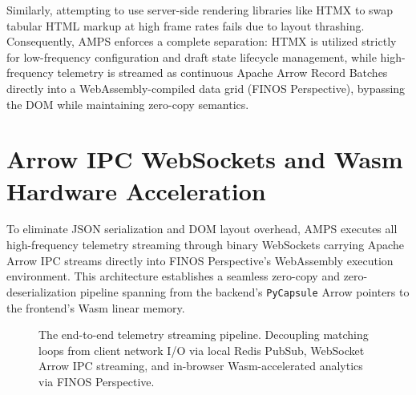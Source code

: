 Similarly, attempting to use server-side rendering libraries like HTMX to swap tabular HTML markup at high frame rates fails due to layout thrashing. Consequently, AMPS enforces a complete separation: HTMX is utilized strictly for low-frequency configuration and draft state lifecycle management, while high-frequency telemetry is streamed as continuous Apache Arrow Record Batches directly into a WebAssembly-compiled data grid (FINOS Perspective), bypassing the DOM while maintaining zero-copy semantics.

\section{Arrow IPC WebSockets and Wasm Hardware Acceleration}

To eliminate JSON serialization and DOM layout overhead, AMPS executes all high-frequency telemetry streaming through binary WebSockets carrying Apache Arrow IPC streams directly into FINOS Perspective's WebAssembly execution environment. This architecture establishes a seamless zero-copy and zero-deserialization pipeline spanning from the backend's \texttt{PyCapsule} Arrow pointers to the frontend's Wasm linear memory.

\begin{figure}[htbp]
\centering
{}
\caption{The end-to-end telemetry streaming pipeline. Decoupling matching loops from client network I/O via local Redis PubSub, WebSocket Arrow IPC streaming, and in-browser Wasm-accelerated analytics via FINOS Perspective.}
\label{fig:perspective_redis_pipeline}
\end{figure}

